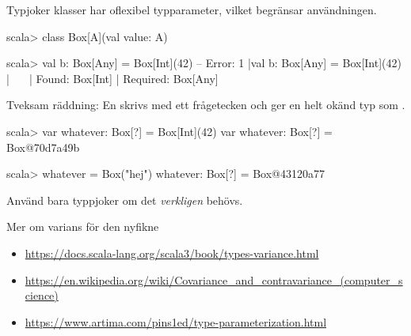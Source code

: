 \begin{Slide}{Typjoker }\SlideFontSmall
{} klasser har oflexibel typparameter, vilket begränsar användningen. %
\begin{REPL}
scala> class Box[A](val value: A)

scala> val b: Box[Any] = Box[Int](42)
-- Error:
1 |val b: Box[Any] = Box[Int](42)
  |                  ^^^^^^^^^^^^
  |                  Found:    Box[Int]
  |                  Required: Box[Any]
\end{REPL}  
Tveksam räddning: En   skrivs med ett frågetecken och ger en helt okänd typ  som .
\begin{REPL}
scala> var whatever: Box[?] = Box[Int](42)
var whatever: Box[?] = Box@70d7a49b
                                                                                    
scala> whatever = Box("hej")
whatever: Box[?] = Box@43120a77
\end{REPL}
Använd bara typpjoker om det \emph{verkligen} behövs.
\end{Slide}


\begin{Slide}{Mer om varians för den nyfikne}
\begin{itemize}\SlideFontSmall
  \item \href{https://docs.scala-lang.org/scala3/book/types-variance.html}{https://docs.scala-lang.org/scala3/book/types-variance.html}
  \item \href{https://en.wikipedia.org/wiki/Covariance_and_contravariance_(computer_science)}{https://en.wikipedia.org/wiki/Covariance\_and\_contravariance\_(computer\_science)}
  \item \href{https://www.artima.com/pins1ed/type-parameterization.html}{https://www.artima.com/pins1ed/type-parameterization.html}

\end{itemize}
\end{Slide}



